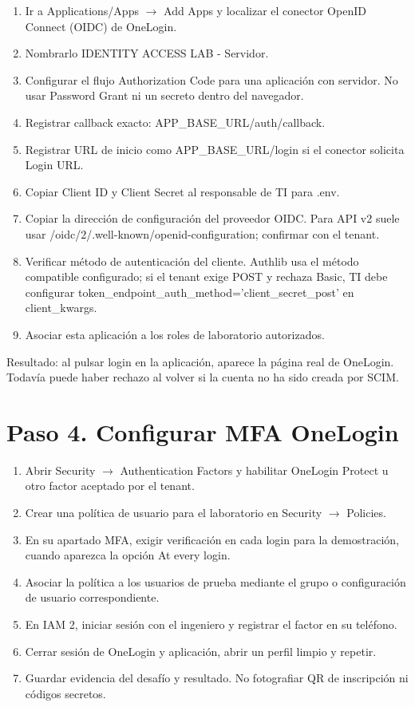 \documentclass[12pt,a4paper]{article}
\begin{document}
\begin{enumerate}
\item Ir a Applications/Apps \(\rightarrow\) Add Apps y localizar el conector OpenID Connect (OIDC) de OneLogin.
\item Nombrarlo \textnormal{IDENTITY ACCESS LAB - Servidor}.
\item Configurar el flujo Authorization Code para una aplicación con servidor. No usar Password Grant ni un secreto dentro del navegador.
\item Registrar callback exacto: \textnormal{APP\_\allowbreak{}BASE\_\allowbreak{}URL/\allowbreak{}auth/\allowbreak{}callback}.
\item Registrar URL de inicio como \textnormal{APP\_\allowbreak{}BASE\_\allowbreak{}URL/\allowbreak{}login} si el conector solicita Login URL.
\item Copiar Client ID y Client Secret al responsable de TI para \textnormal{.env}.
\item Copiar la dirección de configuración del proveedor OIDC. Para API v2 suele usar \textnormal{/\allowbreak{}oidc/\allowbreak{}2/\allowbreak{}.well-known/\allowbreak{}openid-configuration}; confirmar con el tenant.
\item Verificar método de autenticación del cliente. Authlib usa el método compatible configurado; si el tenant exige POST y rechaza Basic, TI debe configurar \textnormal{token\_\allowbreak{}endpoint\_\allowbreak{}auth\_\allowbreak{}method=\allowbreak{}'client\_\allowbreak{}secret\_\allowbreak{}post'} en \textnormal{client\_\allowbreak{}kwargs}.
\item Asociar esta aplicación a los roles de laboratorio autorizados.
\end{enumerate}
Resultado: al pulsar login en la aplicación, aparece la página real de OneLogin. Todavía puede haber rechazo al volver si la cuenta no ha sido creada por SCIM.\par
{}\section*{Paso 4. Configurar MFA OneLogin}
\begin{enumerate}
\item Abrir Security \(\rightarrow\) Authentication Factors y habilitar OneLogin Protect u otro factor aceptado por el tenant.
\item Crear una política de usuario para el laboratorio en Security \(\rightarrow\) Policies.
\item En su apartado MFA, exigir verificación en cada login para la demostración, cuando aparezca la opción \textnormal{At every login}.
\item Asociar la política a los usuarios de prueba mediante el grupo o configuración de usuario correspondiente.
\item En IAM 2, iniciar sesión con el ingeniero y registrar el factor en su teléfono.
\item Cerrar sesión de OneLogin y aplicación, abrir un perfil limpio y repetir.
\item Guardar evidencia del desafío y resultado. No fotografiar QR de inscripción ni códigos secretos.
\end{enumerate}
\end{document}
